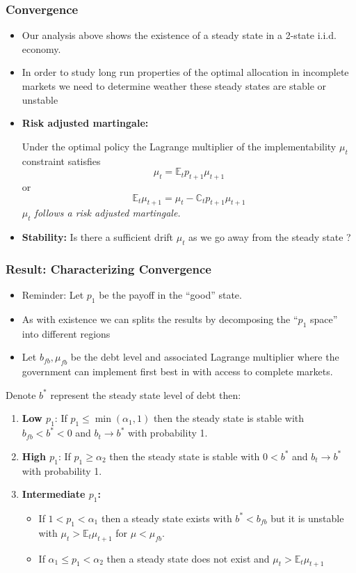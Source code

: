 \documentclass{beamer}
\newcommand{\EE}{\mathbb E}
\begin{document}
 
 \begin{frame}
  \frametitle{Convergence}
  \begin{itemize}
		\item Our analysis above shows the existence of a steady state in a 2-state i.i.d. economy.  
		\item In order to study long run properties of the optimal allocation in incomplete markets we need to determine weather these steady states are stable or unstable
		\item \textbf{Risk adjusted martingale:}
		
		Under the optimal policy the Lagrange multiplier of the implementability $\mu_t$ constraint satisfies
		\[ 
			\mu_t = \EE_t p_{t+1} \mu_{t+1}
		\] or 
		\[ 
		\EE_t  \mu_{t+1}	= \mu_t -\mathbb{C}_t p_{t+1} \mu_{t+1}
		\] 
			\emph{$\mu_t$ follows a risk adjusted martingale.}
	
		\item \textbf{Stability: } Is there a sufficient drift  $\mu_t$ as we go away from the steady state ?
		\end{itemize}
	
 \end{frame}

 
 
 \begin{frame}
  \frametitle{Result: Characterizing Convergence}
  
  \begin{itemize}
  \item Reminder:  Let $p_1$ be the payoff in the ``good'' state.
   \item As with existence we can splits the results by decomposing the ``$p_1$ space'' into different regions
   \item Let $b_{fb},\mu_{fb}$ be the debt level and associated Lagrange multiplier where the government can implement first best in with access to complete markets.
  \end{itemize}
 	\begin{theorem}
Denote $b^*$ represent the steady state level of debt then:
		\begin{enumerate}
			\item  \textbf{Low $p_1$}: If $p_1\leq\min(\alpha_1,1)$ then the steady state is stable with $b_{fb}<b^*<0$ and $b_t\rightarrow b^*$ with probability 1.
			\item \textbf{High  $p_1$}:  If $p_1 \geq \alpha_2$ then the steady state is stable with $0<b^*$ and $b_t \rightarrow b^*$ with probability 1.
			\item \textbf{Intermediate $p_1$:} 
			\begin{itemize}
			  \item  If $1 < p_1 <\alpha_1$ then a steady state exists with $b^* < b_{fb}$ but it is unstable with $\mu_t >\EE_t \mu_{t+1}$ for $\mu < \mu_{fb}$.
			\item  If $\alpha_1\leq p_1<\alpha_2$ then a steady state does not exist and $\mu_t > \EE_t\mu_{t+1}$
			\end{itemize}
		
		\end{enumerate} 
	\end{theorem} 
 \end{frame}
\end{document}
